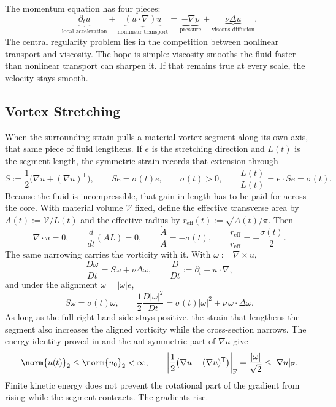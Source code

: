 
The momentum equation has four pieces:
\[
  \underbrace{\partial_t u}_{\text{local acceleration}}
  +
  \underbrace{(u\cdot\nabla)u}_{\text{nonlinear transport}}
  =
  \underbrace{-\nabla p}_{\text{pressure}}
  +
  \underbrace{\nu\Delta u}_{\text{viscous diffusion}}.
\]
The central regularity problem lies in the competition between nonlinear transport and viscosity.
The hope is simple: viscosity smooths the fluid faster than nonlinear transport can sharpen it.
If that remains true at every scale, the velocity stays smooth.

\subsection{Vortex Stretching}\label{sub:ThePerfectlyStretchingVortex}

When the surrounding strain pulls a material vortex segment along its own axis, that same piece of fluid lengthens. If \(e\) is the stretching direction and \(L(t)\) is the segment length, the symmetric strain records that extension through
\[
  S:=\frac12\bigl(\nabla u+(\nabla u)^{\mathsf T}\bigr),
  \qquad
  Se=\sigma(t)e,
  \qquad
  \sigma(t)>0,
  \qquad
  \frac{\dot L(t)}{L(t)}
  =
  e\cdot Se
  =
  \sigma(t).
\]
Because the fluid is incompressible, that gain in length has to be paid for across the core. With material volume \(\mathcal V\) fixed, define the effective transverse area by \(A(t):=\mathcal V/L(t)\) and the effective radius by \(r_{\mathrm{eff}}(t):=\sqrt{A(t)/\pi}\). Then
\[
  \nabla\cdot u=0,
  \qquad
  \frac{d}{dt}(A L)=0,
  \qquad
  \frac{\dot A}{A}=-\sigma(t),
  \qquad
  \frac{\dot r_{\mathrm{eff}}}{r_{\mathrm{eff}}}
  =
  -\frac{\sigma(t)}{2}.
\]
The same narrowing carries the vorticity with it. With \(\omega:=\nabla\times u\),
\[
  \frac{D\omega}{Dt}
  =
  S\omega+\nu\Delta\omega,
  \qquad
  \frac{D}{Dt}
  :=
  \partial_t+u\cdot\nabla,
\]
and under the alignment \(\omega=|\omega|e\),
\[
  S\omega
  =
  \sigma(t)\omega,
  \qquad
  \frac12\frac{D|\omega|^2}{Dt}
  =
  \sigma(t)|\omega|^2
  +
  \nu\,\omega\cdot\Delta\omega.
\]
As long as the full right-hand side stays positive, the strain that lengthens the segment also increases the aligned vorticity while the cross-section narrows. The energy identity proved in  and the antisymmetric part of \(\nabla u\) give
\[
  \norm{u(t)}_2
  \leq
  \norm{u_0}_2
  <\infty,
  \qquad
  \left|\frac12\bigl(\nabla u-(\nabla u)^{\mathsf T}\bigr)\right|_{\mathrm F}
  =
  \frac{|\omega|}{\sqrt2}
  \leq
  |\nabla u|_{\mathrm F}.
\]
Finite kinetic energy does not prevent the rotational part of the gradient from rising while the segment contracts. The gradients rise.

